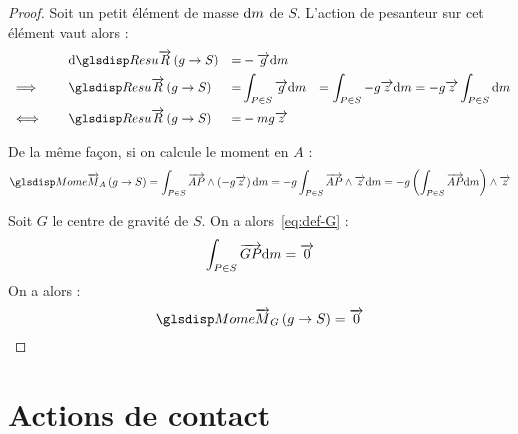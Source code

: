 \begin{proof}
	Soit un petit élément de masse $\mathrm{d}m$ de $S$. L'action de pesanteur sur cet élément vaut alors :
	\begin{alignat*}{4}
		&&				&\mathrm{d}\R{g}{S}	&=&-\vect{g} \dm&\\
		&\implies\quad&	&\R{g}{S}			&=&\int_{P\in S}\vect{g}\dm&=\int_{P\in S}-g\vect{z}\dm=-g\vect{z}\int_{P\in S}\dm\\
		&\iff\quad&&\R{g}{S}&=&-mg\vect{z}&
	\end{alignat*}
	
	De la même façon, si on calcule le moment en $A$ :
	\begin{equation*}
		\M{A}{g}{S}=\int_{P\in S}\vect{AP}\wedge\left(-g\vect{z}\right)\dm
		=-g\int_{P\in S}\vect{AP}\wedge\vect{z}\dm
		=-g\left(\int_{P\in S}\vect{AP}\dm\right)\wedge\vect{z}
	\end{equation*}
	
Soit $G$ le centre de gravité de $S$. On a alors~\eqref{eq:def-G} :
\begin{equation*}
	\int_{P\in S}\overrightarrow{GP}\mathrm{d}m=\overrightarrow{0}
\end{equation*}
On a alors :
\begin{equation*}
	\M{G}{g}{S}=\vect{0}
\end{equation*}	
\end{proof}

\section{Actions de contact}
